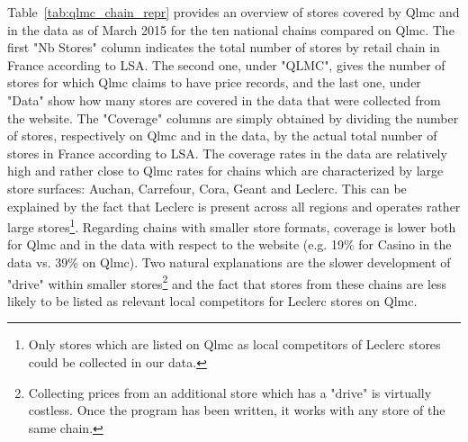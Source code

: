 \documentclass[english]{article}
\begin{document}
Table~\ref{tab:qlmc_chain_repr} provides an overview of stores covered by Qlmc and in the data as of March 2015 for the ten national chains compared on Qlmc. The first "Nb Stores" column indicates the total number of stores by retail chain in France according to LSA. The second one, under "QLMC", gives the number of stores for which Qlmc claims to have price records, and the last one, under "Data" show how many stores are covered in the data that were collected from the website. The "Coverage" columns are simply obtained by dividing the number of stores, respectively on Qlmc and in the data, by the actual total number of stores in France according to LSA. The coverage rates in the data are relatively high and rather close to Qlmc rates for chains which are characterized by large store surfaces: Auchan, Carrefour, Cora, Geant and Leclerc. This can be explained by the fact that Leclerc is present across all regions and operates rather large stores\footnote{Only stores which are listed on Qlmc as local competitors of Leclerc stores could be collected in our data.}. Regarding chains with smaller store formats, coverage is lower both for Qlmc and in the data with respect to the website (e.g. 19\% for Casino in the data vs. 39\% on Qlmc). Two natural explanations are the slower development of "drive" within smaller stores\footnote{Collecting prices from an additional store which has a "drive" is virtually costless. Once the program has been written, it works with any store of the same chain.} and the fact that stores from these chains are less likely to be listed as relevant local competitors for Leclerc stores on Qlmc.
\end{document}
